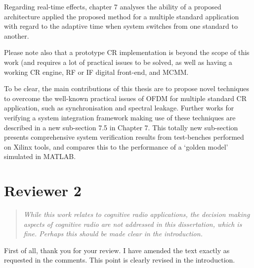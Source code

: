 \documentclass{article}
\begin{document}
Regarding real-time effects, chapter 7 analyses the ability of a proposed architecture applied the proposed method for a multiple standard application with regard to the adaptive time when system switches from one standard to another. %

Please note also that a prototype CR implementation is beyond the scope of this work (and requires a lot of practical issues to be solved, as well as having a working CR engine, RF or IF digital front-end, and MCMM. 

To be clear, the main contributions of this thesis are to propose novel techniques to overcome the well-known practical issues of OFDM for multiple standard CR application, such as synchronisation and spectral leakage. %
Further works for verifying a system integration framework making use of these techniques are described in a new sub-section 7.5 in Chapter 7. This totally new sub-section presents comprehensive system verification results from test-benches performed on Xilinx tools, and compares this to the performance of a `golden model' simulated in MATLAB.


\section*{Reviewer 2}
\begin{quote}
\emph{While this work relates to cognitive radio applications, the decision making aspects of cognitive radio are not addressed in this dissertation, which is fine. Perhaps this should be made clear in the introduction.}
\end{quote}
First of all, thank you for your review. I have amended the text exactly as requested in the comments.
This point is clearly revised in the introduction.
\end{document}
